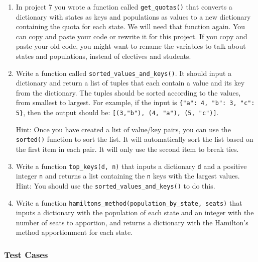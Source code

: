 \documentclass[12pt]{article}
\begin{document}
\begin{enumerate}
\item In project 7 you wrote a function called \verb|get_quotas()| that converts a dictionary with states as keys and populations as values to a new dictionary containing the quota for each state. %
We will need that function again.  You can copy and paste your code or rewrite it for this project.  If you copy and paste your old code, you might want to rename the variables to talk about states and populations, instead of electives and students. 

\item Write a function called \verb|sorted_values_and_keys()|.  It should input a dictionary and return a list of tuples that each contain a value and its key from the dictionary. The tuples should be sorted according to the values, from smallest to largest. For example, if the input is \verb|{"a": 4, "b": 3, "c": 5}|, then the output should be: \verb|[(3,"b"), (4, "a"), (5, "c")]|.

Hint: Once you have created a list of value/key pairs, you can use the \verb|sorted()| function to sort the list.  It will automatically sort the list based on the first item in each pair. It will only use the second item to break ties.  

\item Write a function \verb|top_keys(d, n)| that inputs a dictionary \verb|d| and a positive integer \verb|n| and returns a list containing the \verb|n| keys with the largest values. Hint: You should use the \verb|sorted_values_and_keys()| to do this. 

\item Write a function \verb|hamiltons_method(population_by_state, seats)| that inputs a dictionary with the population of each state and an integer with the number of seats to apportion, and returns a dictionary with the Hamilton's method apportionment for each state.  



\end{enumerate}

\subsubsection*{Test Cases}
\end{document}
